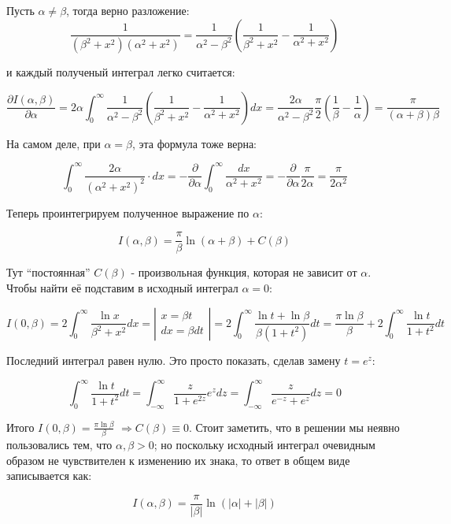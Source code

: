 \documentclass[a4paper,12pt]{article}
\begin{document}
\noindent
Пусть $\alpha\neq\beta$, тогда верно разложение: 
\[
\frac{1}{(\beta^{2}+x^{2})(\alpha^{2}+x^{2})}=\frac{1}{\alpha^{2}-\beta^{2}}\left(\frac{1}{\beta^{2}+x^{2}}-\frac{1}{\alpha^{2}+x^{2}}\right)
\]

\noindent
и каждый полученый интеграл легко считается:

\[
\frac{\partial I(\alpha,\beta)}{\partial\alpha}=2\alpha\int_{0}^{\infty}\frac{1}{\alpha^{2}-\beta^{2}}\left(\frac{1}{\beta^{2}+x^{2}}-\frac{1}{\alpha^{2}+x^{2}}\right)dx=\frac{2\alpha}{\alpha^{2}-\beta^{2}}\frac{\pi}{2}\left(\frac{1}{\beta}-\frac{1}{\alpha}\right)=\frac{\pi}{(\alpha+\beta)\beta}
\]

\noindent
На самом деле, при $\alpha=\beta$, эта формула тоже верна:

\[
\int_{0}^{\infty}\frac{2\alpha}{(\alpha^{2}+x^{2})^{2}}\cdot dx=-\frac{\partial}{\partial\alpha}\int_{0}^{\infty}\frac{dx}{\alpha^{2}+x^{2}}=-\frac{\partial}{\partial\alpha}\frac{\pi}{2\alpha}=\frac{\pi}{2\alpha^{2}}
\]

\noindent
Теперь проинтегрируем полученное выражение по $\alpha$:

\[
I(\alpha,\beta)=\frac{\pi}{\beta}\ln(\alpha+\beta)+C(\beta)
\]

\noindent
Тут ``постоянная'' $C(\beta)$ - произвольная функция, которая не
зависит от $\alpha$. Чтобы найти её подставим в исходный интеграл
$\alpha=0$:

\[
I\left(0,\beta\right)=2\int_{0}^{\infty}\frac{\ln x}{\beta^{2}+x^{2}}dx=\left|\begin{array}{c}
x=\beta t\\
dx=\beta dt
\end{array}\right|=2\int_{0}^{\infty}\frac{\ln t+\ln\beta}{\beta(1+t^{2})}dt=\frac{\pi\ln\beta}{\beta}+2\int_{0}^{\infty}\frac{\ln t}{1+t^{2}}dt
\]

\noindent
Последний интеграл равен нулю. Это просто показать, сделав замену $t=e^{z}$:

\[
\int_{0}^{\infty}\frac{\ln t}{1+t^{2}}dt=\int_{-\infty}^{\infty}\frac{z}{1+e^{2z}}e^{z}dz=\int_{-\infty}^{\infty}\frac{z}{e^{-z}+e^{z}}dz=0
\]

\noindent
Итого $I(0,\beta)=\frac{\pi\ln\beta}{\beta}$ $\Rightarrow C(\beta)\equiv0$.
Стоит заметить, что в решении мы неявно пользовались тем, что $\alpha,\beta>0$;
но поскольку исходный интеграл очевидным образом не чувствителен к
изменению их знака, то ответ в общем виде записывается как:

\[
I\left(\alpha,\beta\right)=\frac{\pi}{|\beta|}\ln(|\alpha|+|\beta|)
\]
\end{document}
